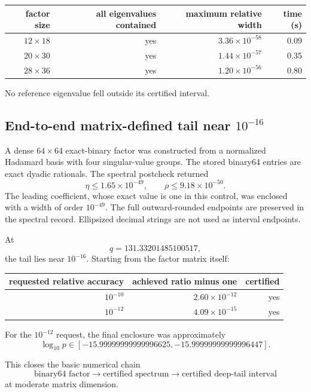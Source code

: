 \begin{center}
\begin{tabular}{@{}rrrr@{}}
\toprule
factor size & all eigenvalues contained & maximum relative width & time (s)\\
\midrule
$12\times18$ & yes & $3.36\times10^{-58}$ & 0.09\\
$20\times30$ & yes & $1.44\times10^{-57}$ & 0.35\\
$28\times36$ & yes & $1.20\times10^{-56}$ & 0.80\\
\bottomrule
\end{tabular}
\end{center}

No reference eigenvalue fell outside its certified interval.

\subsection{End-to-end matrix-defined tail near \texorpdfstring{\(10^{-16}\)}{1e-16}}

A dense \(64\times64\) exact-binary factor was constructed from a normalized
Hadamard basis with four singular-value groups.  The stored binary64 entries
are exact dyadic rationals.  The spectral postcheck returned
\[
\eta\le1.65\times10^{-49},
\qquad
\rho\le9.18\times10^{-50}.
\]
The leading coefficient, whose exact value is one in this control,
was enclosed with a width of order $10^{-49}$. The full outward-rounded
endpoints are preserved in the spectral record. Ellipsized decimal strings
are not used as interval endpoints.

At
\[
q=131.33201485100517,
\]
the tail lies near \(10^{-16}\).  Starting from the factor matrix itself:

\begin{center}
\begin{tabular}{@{}rrr@{}}
\toprule
requested relative accuracy & achieved ratio minus one & certified\\
\midrule
$10^{-10}$ & $2.60\times10^{-12}$ & yes\\
$10^{-12}$ & $4.09\times10^{-15}$ & yes\\
\bottomrule
\end{tabular}
\end{center}

For the \(10^{-12}\) request, the final enclosure was approximately
\[
\log_{10}p
\in
[-15.99999999999996625,
 -15.99999999999996447].
\]

This closes the basic numerical chain
\[
\boxed{
\text{binary64 factor}
\longrightarrow
\text{certified spectrum}
\longrightarrow
\text{certified deep-tail interval}
}
\]
at moderate matrix dimension.

